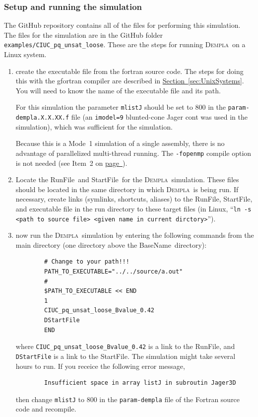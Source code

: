 \documentclass[letterpaper,11pt]{article}
\newcommand{\Dempla}{\textsc{Dempla}}
\newcommand{\RunFile}{\textsf{RunFile}}
\newcommand{\StartFile}{\textsf{StartFile}}
\newcommand{\BaseName}{\textsf{BaseName}}
\begin{document}
\subsubsection{Setup and running the simulation}\label{sec:setupCIUC2}
The GitHub repository contains all of the files for
performing this simulation.
The files for the simulation
are in the GitHub folder
\texttt{examples/CIUC\_pq\_unsat\_loose}.
These are the steps for running \Dempla\ on a Linux system.
%
\begin{enumerate}
	\item
	create the executable file from the fortran source code.
	The steps for doing this with the \textsf{gfortran}
	compiler are described in
	\hyperref[sec:UnixSystems]{Section~\ref*{sec:UnixSystems}}.
	You will need to know the name of the executable
	file and its path.
	\par
	For this simulation the parameter \texttt{mlistJ} should be
	set to 800 in the \texttt{param-dempla.X.X.XX.f} file
	(an \texttt{imodel=9} blunted-cone Jager cont
	was used in the simulation),
	which was sufficient for the simulation.
	\par
	Because this is a Mode~1 simulation of a single
	assembly, there is no advantage of parallelized
	multi-thread running.
	The \texttt{-fopenmp} compile option is not needed
	(see Item~2 on
	\hyperref[item:compile]{page~\pageref*{item:compile}}).
	\item
	Locate the \RunFile\ and \StartFile\ for the
	\Dempla\ simulation.
	These files should be located in the same directory
	in which \Dempla\ is being run.
	If necessary, create links (symlinks, shortcuts, aliases)
	to the \RunFile, \StartFile, and executable
	file in the run directory to these target files
	(in Linux,
	``\texttt{ln -s <path to source file> <given name in current dirctory>}'').
	\item
	now run the \Dempla\ simulation
	by entering the following commands from the main directory
	(one directory above the \BaseName\ directory):
	\begin{verbatim}
		# Change to your path!!!
		PATH_TO_EXECUTABLE="../../source/a.out"
		#
		$PATH_TO_EXECUTABLE << END
		1
		CIUC_pq_unsat_loose_Bvalue_0.42
		DStartFile
		END
	\end{verbatim}
	where \texttt{CIUC\_pq\_unsat\_loose\_Bvalue\_0.42}
	is a link to the \RunFile,
	and \texttt{DStartFile} is a link to the \StartFile.
	The simulation might take several hours to run.
	If you receice the following error message,
	\begin{verbatim}
		Insufficient space in array listJ in subroutin Jager3D
	\end{verbatim}
	then change \texttt{mlistJ} to 800 in the
	\texttt{param-dempla} file of the Fortran source code
	and recompile.
\end{enumerate}
%
%
\end{document}
